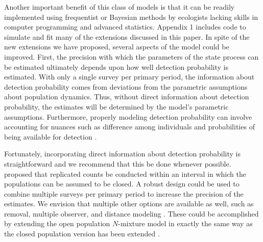\documentclass[12pt,english]{article}
\begin{document}
\begin{spacing}{1.9}
\begin{flushleft}
Another important benefit of this class of models is that it can be
readily implemented using frequentist or Bayesian methods by
ecologists lacking skills in computer programming and advanced
statistics. Appendix 1 includes code to
simulate and fit many of the extensions discussed in this paper.
In spite of the new extensions we have proposed, several aspects of
the model could be improved. First, the precision with which the
parameters of the state process can be estimated ultimately depends
upon how well detection probability is estimated. With
only a single survey per primary period, the information about
detection probability comes from deviations from the parametric
assumptions about population dynamics. Thus, without direct information
about detection probability, the estimates will be determined by the
model's parametric assumptions. Furthermore, properly modeling detection
probability can involve accounting for nuances such as difference
among individuals and probabilities of being available for detection
\citep{nichols_etal:2009}.

Fortunately, incorporating direct information about detection probability 
is straightforward and we recommend that this be done whenever
possible. \citet{dail_madsen:2011} proposed that
replicated counts be conducted within an interval in which the populations can 
be assumed to be closed. A robust design \citep{pollock:1982} could be 
used to combine multiple surveys per
primary period to increase the precision of the estimates. We envision
that multiple other options are available as well, such as removal,
multiple observer, and distance modeling \citep{williams_etal:2002}. These could be
accomplished by extending the open population $N$-mixture model
in exactly the same way as the closed population version has been
extended \citep[e.g.,][]{royle_etal:2004}.


\end{flushleft}
\end{spacing}
\end{document}
